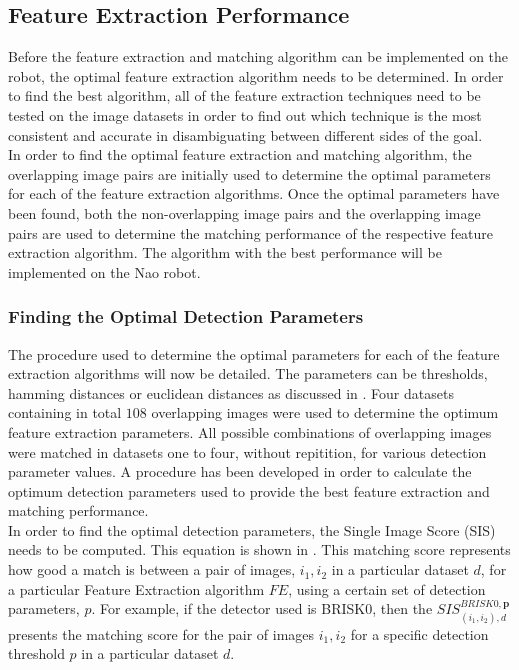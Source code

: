 \documentclass{article}
\begin{document}
\subsection{Feature Extraction Performance}
\label{sec:featureExtraction}
Before the feature extraction and matching algorithm can be implemented on the robot, the optimal feature extraction algorithm needs to be determined. In order to find the best algorithm, all of the feature extraction techniques need to be tested on the image datasets in order to find out which technique is the most consistent and accurate in disambiguating between different sides of the goal. \\

In order to find the optimal feature extraction and matching algorithm, the overlapping image pairs are initially used to determine the optimal parameters for each of the feature extraction algorithms. Once the optimal parameters have been found, both the non-overlapping image pairs and the overlapping image pairs are used to determine the matching performance of the respective feature extraction algorithm. The algorithm with the best performance will be implemented on the Nao robot.\\

\subsubsection{Finding the Optimal Detection Parameters}
\label{sec:optimalParameters}
The procedure used to determine the optimal parameters for each of the feature extraction algorithms will now be detailed. The parameters can be thresholds, hamming distances or euclidean distances as discussed in . Four datasets containing in total $108$ overlapping images were used to determine the optimum feature extraction parameters. All possible combinations of overlapping images were matched in datasets  one to four, without repitition, for various detection parameter values. A procedure has been developed in order to calculate the optimum detection parameters used to provide the best feature extraction and matching performance.\\
In order to find the optimal detection parameters, the Single Image Score (SIS) needs to be computed. This equation is shown in . This matching score represents how good a match is between a pair of images, $i_1, i_2$ in a particular dataset $d$, for a particular Feature Extraction algorithm $FE$, using a certain set of detection parameters, $p$. For example, if the detector used is BRISK0, then the $SIS_{(i_1, i_2), d}^{BRISK0, \textbf{p}}$ presents the matching score for the pair of images $i_1, i_2$ for a specific detection threshold $p$ in a particular dataset $d$. \\
\end{document}
